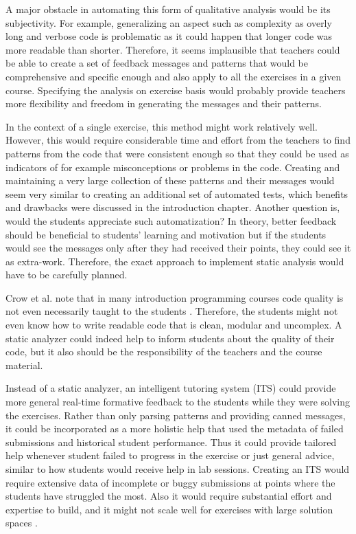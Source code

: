 A major obstacle in automating this form of qualitative analysis would be its subjectivity. For example, generalizing an aspect such as complexity as overly long and verbose code is problematic as it could happen that longer code was more readable than shorter. Therefore, it seems implausible that teachers could be able to create a set of feedback messages and patterns that would be comprehensive and specific enough and also apply to all the exercises in a given course. Specifying the analysis on exercise basis would probably provide teachers more flexibility and freedom in generating the messages and their patterns.

In the context of a single exercise, this method might work relatively well. However, this would require considerable time and effort from the teachers to find patterns from the code that were consistent enough so that they could be used as indicators of for example misconceptions or problems in the code. Creating and maintaining a very large collection of these patterns and their messages would seem very similar to creating an additional set of automated tests, which benefits and drawbacks were discussed in the introduction chapter. Another question is, would the students appreciate such automatization? In theory, better feedback should be beneficial to students' learning and motivation but if the students would see the messages only after they had received their points, they could see it as extra-work. Therefore, the exact approach to implement static analysis would have to be carefully planned.

Crow et al. note that in many introduction programming courses code quality is not even necessarily taught to the students \cite{crow-code-quality-2020}. Therefore, the students might not even know how to write readable code that is clean, modular and uncomplex. A static analyzer could indeed help to inform students about the quality of their code, but it also should be the responsibility of the teachers and the course material.

Instead of a static analyzer, an intelligent tutoring system (ITS) could provide more general real-time formative feedback to the students while they were solving the exercises. Rather than only parsing patterns and providing canned messages, it could be incorporated as a more holistic help that used the metadata of failed submissions and historical student performance. Thus it could provide tailored help whenever student failed to progress in the exercise or just general advice, similar to how students would receive help in lab sessions. Creating an ITS would require extensive data of incomplete or buggy submissions at points where the students have struggled the most. Also it would require substantial effort and expertise to build, and it might not scale well for exercises with large solution spaces \cite{glassman-reusable-feedback, its-2020}.

